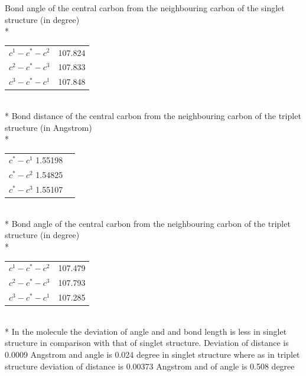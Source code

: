 \documentclass{article}
\begin{document}
Bond angle of the central carbon from the neighbouring carbon of the singlet structure (in degree)\\*
\begin{tabular}{c c}
\(c^{1}-c^{*}-c^{2}\) & 107.824\\
\(c^{2}-c^{*}-c^{3}\) & 107.833\\
\(c^{3}-c^{*}-c^{1}\) & 107.848\\
\end{tabular}\\*
Bond distance of the central carbon from the neighbouring carbon of the triplet structure (in Angstrom)\\*
\begin{tabular}{c c}
\(c^{*}-c^{1}\) 1.55198 \\
\(c^{*}-c^{2}\) 1.54825 \\
\(c^{*}-c^{3}\) 1.55107 \\
\end{tabular}\\*
Bond angle of the central carbon from the neighbouring carbon of the triplet structure (in degree)\\*
\begin{tabular}{c c}
\(c^{1}-c^{*}-c^{2}\) & 107.479 \\
\(c^{2}-c^{*}-c^{3}\) & 107.793 \\
\(c^{3}-c^{*}-c^{1}\) & 107.285 \\
\end{tabular}\\*
In the molecule the deviation of angle and and bond length is less in singlet structure in comparison with that of singlet structure. 
Deviation of distance is 0.0009 Angstrom and angle is 0.024 degree in singlet structure where as in triplet structure deviation of distance is 0.00373 Angstrom and of angle is 0.508 degree

\pagebreak
\end{document}
